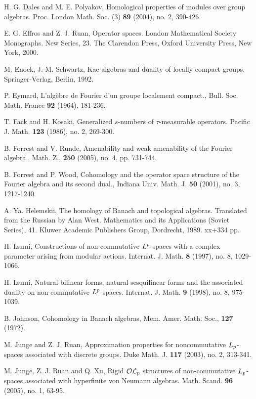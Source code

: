 \documentclass[10pt]{amsart}
\numberwithin{thm}{section}
\numberwithin{equation}{section}
\begin{document}
\begin{thebibliography}{1}
H. G. Dales and M. E. Polyakov, Homological properties of modules over group algebras.  Proc. London Math. Soc. (3) \textbf{89} (2004), no. 2, 390-426.

E. G. Effros and Z. J. Ruan, Operator spaces. London Mathematical Society Monographs. New Series, 23.
The Clarendon Press, Oxford University Press, New York, 2000.

M. Enock, J.-M. Schwartz, Kac algebras and duality of locally compact groups. Springer-Verlag, Berlin, 1992.

P. Eymard, L'alg\`{e}bre de Fourier d'un groupe localement
compact., Bull. Soc. Math. France \textbf{92 }(1964), 181-236.

T. Fack and H. Kosaki, Generalized $s$-numbers of $\tau$-measurable operators. Pacific J. Math. \textbf{123} (1986), no. 2, 269-300.

  B. Forrest and V. Runde, Amenability and weak amenability of the Fourier algebra., 
Math. Z., \textbf{250} (2005), no. 4, pp. 731-744.

B. Forrest and P. Wood, Cohomology and the operator space structure of the 
Fourier algebra and its second dual., Indiana Univ. Math. J. \textbf{50} (2001), no. 3, 1217-1240. 
 
A. Ya. Helemskii, The homology of Banach and topological algebras. Translated from the Russian by Alan West.
Mathematics and its Applications (Soviet Series), 41. Kluwer Academic Publishers Group, Dordrecht, 1989. xx+334 pp.

H. Izumi, Constructions of non-commutative $L\sp p$-spaces with a complex parameter arising from modular actions. 
Internat. J. Math. \textbf{8} (1997), no. 8, 1029-1066.

H. Izumi, Natural bilinear forms, natural sesquilinear forms and the associated duality on non-commutative $L\sp p$-spaces.
Internat. J. Math. \textbf{9} (1998), no. 8, 975-1039.

  B. Johnson, Cohomology in Banach algebras, Mem. Amer. Math.
Soc., \textbf{127} (1972).

M. Junge and Z. J. Ruan, Approximation properties for noncommutative $L\sb p$-spaces associated with discrete groups.
Duke Math. J. \textbf{117} (2003),  no. 2, 313-341. 

M. Junge, Z. J. Ruan and Q. Xu, Rigid $\mathcal{OL}\sb p$ structures of non-commutative $L\sb p$-spaces associated with
hyperfinite von Neumann algebras. Math. Scand. \textbf{96} (2005), no. 1, 63-95. 


\end{thebibliography}
\end{document}
